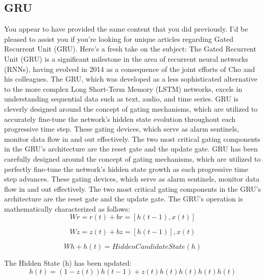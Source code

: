 \documentclass[a4paper,fleqn]{cas-sc}
\begin{document}
\subsection{GRU}
You appear to have provided the same content that you did previously. I’d be pleased to assist you if you’re looking for unique articles regarding Gated Recurrent Unit (GRU). Here’s a fresh take on the subject:
The Gated Recurrent Unit (GRU) is a significant milestone in the area of recurrent neural networks (RNNs), having evolved in 2014 as a consequence of the joint efforts of Cho and his colleagues. The GRU, which was developed as a less sophisticated alternative to the more complex Long Short-Term Memory (LSTM) networks, excels in understanding sequential data such as text, audio, and time series. GRU is cleverly designed around the concept of gating mechanisms, which are utilized to accurately fine-tune the network’s hidden state evolution throughout each progressive time step. These gating devices, which serve as alarm sentinels, monitor data flow in and out effectively.\cite{he2019wind} The two most critical gating components in the GRU’s architecture are the reset gate and the update gate. GRU has been carefully designed
around the concept of gating mechanisms, which are utilized to perfectly fine-tune the network’s hidden state growth as each progressive time step advances. These gating devices, which serve as alarm sentinels, monitor data flow in and out effectively. The two most critical gating components in the GRU’s architecture are the reset gate and the update gate. The GRU’s operation is mathematically characterized as follows:
\begin{equation}
  𝑊𝑟 = 𝑟(𝑡) + 𝑏𝑟 = [ℎ(𝑡 − 1), 𝑥(𝑡)]
\end{equation}

\begin{equation}
  𝑊𝑧 = 𝑧(𝑡) + 𝑏𝑧 = [ℎ(𝑡 − 1)], 𝑥(𝑡)
\end{equation}

\begin{equation}
  [𝑟(𝑡)ℎ(𝑡 − 1), 𝑥(𝑡)]𝑊ℎ + ℎ(𝑡) = Hidden Candidate State (h)
\end{equation}

The Hidden State (h) has been updated: 
\begin{equation}
  h(t) = (1 - z(t)) h(t-1) + z(t) h(t) h(t) h(t) h(t)
\end{equation}
\end{document}
